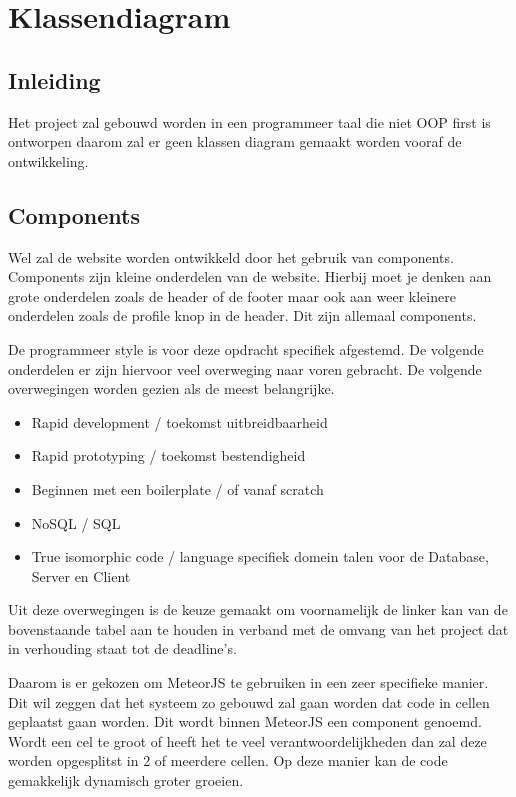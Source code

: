 \documentclass[]{report}
\begin{document}
\chapter{Klassendiagram}

\section{Inleiding}
Het project zal gebouwd worden in een programmeer taal die niet OOP first is ontworpen daarom zal er geen klassen diagram gemaakt worden vooraf de ontwikkeling.

\section{Components}
Wel zal de website worden ontwikkeld door het gebruik van components. Components zijn kleine onderdelen van de website. Hierbij moet je denken aan grote onderdelen zoals de header of de footer maar ook aan weer kleinere onderdelen zoals de profile knop in de header. Dit zijn allemaal components.

\vspace{1 cm}

De programmeer style is voor deze opdracht specifiek afgestemd. De volgende onderdelen er zijn hiervoor veel overweging naar voren gebracht. De volgende overwegingen worden gezien als de meest belangrijke.

\begin{itemize}
	\item Rapid development / toekomst uitbreidbaarheid
	\item Rapid prototyping / toekomst bestendigheid
	\item Beginnen met een boilerplate / of vanaf scratch
	\item NoSQL / SQL
	\item True isomorphic code / language specifiek domein talen voor de Database, Server en Client
\end{itemize}

Uit deze overwegingen is de keuze gemaakt om voornamelijk de linker kan van de bovenstaande tabel aan te houden in verband met de omvang van het project dat in verhouding staat tot de deadline's. 

Daarom is er gekozen om MeteorJS te gebruiken in een zeer specifieke manier. Dit wil zeggen dat het systeem zo gebouwd zal gaan worden dat code in cellen geplaatst gaan worden. Dit wordt binnen MeteorJS een component genoemd. Wordt een cel te groot of heeft het te veel verantwoordelijkheden dan zal deze worden opgesplitst in 2 of meerdere cellen. Op deze manier kan de code gemakkelijk dynamisch groter groeien.
\end{document}
